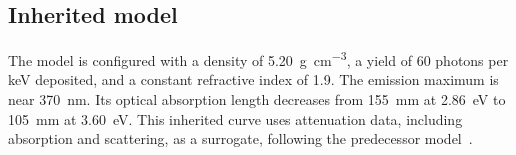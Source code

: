 \subsection{Inherited  model}

The  model is configured with a density of \qty{5.20}{\gram\per\cubic\centi\metre}, a yield of 60 photons per \unit{\kilo\electronvolt} deposited, and a constant refractive index of 1.9. The emission maximum is near \qty{370}{\nano\metre}. Its optical absorption length decreases from \qty{155}{\milli\metre} at \qty{2.86}{\electronvolt} to \qty{105}{\milli\metre} at \qty{3.60}{\electronvolt}. This inherited curve uses  attenuation data, including absorption and scattering, as a surrogate, following the predecessor model~\parencite[p.~22, table 2.1]{ovsiannikova2020light}.

